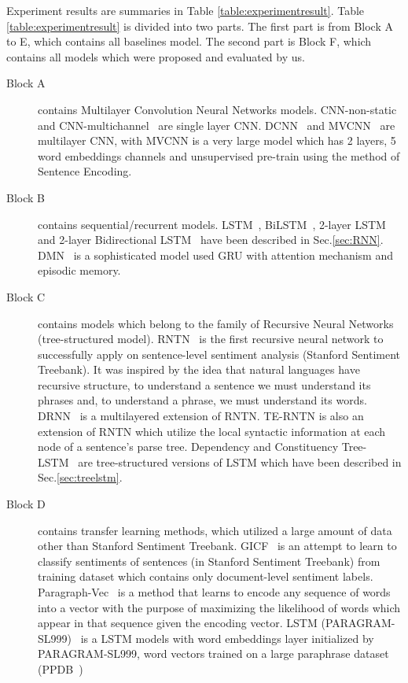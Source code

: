 Experiment results are summaries in Table \ref{table:experimentresult}.
Table \ref{table:experimentresult} is divided into two parts.
The first part is from Block A to E, which contains all baselines model.
The second part is Block F, which contains all models which were proposed and evaluated by us.
\begin{description}
	\item[Block A] contains Multilayer Convolution Neural Networks models.
	CNN-non-static and CNN-multichannel~\cite{KimCNN} are single layer CNN.
	DCNN~\cite{DCNN} and MVCNN~\cite{2-layer-cnn} are multilayer CNN, with MVCNN is a very large model  which has 2 layers, 5 word embeddings channels and unsupervised pre-train using the method of Sentence Encoding.
	\item[Block B] contains sequential/recurrent models.
	LSTM~\cite{originLSTM}, BiLSTM~\cite{GravesLSTM}, 2-layer LSTM~\cite{GravesLSTM} and 2-layer Bidirectional LSTM~\cite{GravesLSTM} have been described in Sec.\ref{sec:RNN}.
	DMN~\cite{attention-gru} is a sophisticated model used GRU with attention mechanism and episodic memory.
	\item[Block C] contains models which belong to the family of Recursive Neural Networks (tree-structured model).
	RNTN~\cite{socher2013recursive} is the first recursive neural network to successfully apply on sentence-level sentiment analysis (Stanford Sentiment Treebank).
	It was inspired by the idea that natural languages have recursive structure, to understand a sentence we must understand its phrases and, to understand a phrase, we must understand its words.
	DRNN~\cite{IrsoyDRNN} is a multilayered extension of RNTN.
	TE-RNTN is also an extension of RNTN which utilize the local syntactic information at each node of a sentence's parse tree.
	Dependency and Constituency Tree-LSTM~\cite{treeLSTM} are tree-structured versions of LSTM which have been described in Sec.\ref{sec:treelstm}.
	\item[Block D] contains transfer learning methods, which utilized a large amount of data other than Stanford Sentiment Treebank.
	GICF~\cite{group-instance} is an attempt to learn to classify sentiments of sentences (in Stanford Sentiment Treebank) from training dataset which contains only document-level sentiment labels.
	Paragraph-Vec~\cite{ParagraphVec} is a method that learns to encode any sequence of words into a vector with the purpose of maximizing the likelihood of words which appear in that sequence given the encoding vector.
	LSTM (PARAGRAM-SL999)~\cite{wieting2015towards} is a LSTM models with word embeddings layer initialized by PARAGRAM-SL999, word vectors trained on a large paraphrase dataset (PPDB~\cite{ganitkevitch2013ppdb}) %

\end{description}
